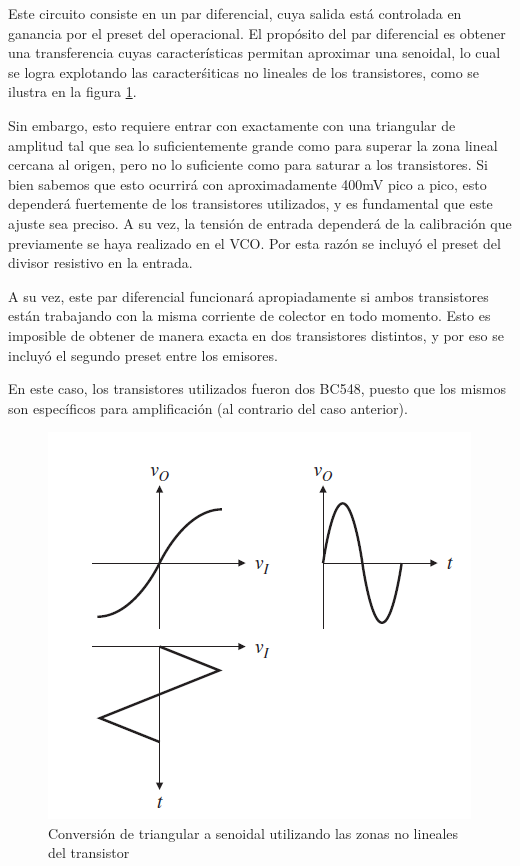 \documentclass[../../tc_tp6_main.tex]{subfiles}
\begin{document}
Este circuito consiste en un par diferencial, cuya salida est\'a controlada en ganancia por el preset del operacional. El prop\'osito del par diferencial es obtener una transferencia cuyas caracter\'isticas permitan aproximar una senoidal, lo cual se logra explotando las caracter\'siticas no lineales de los transistores, como se ilustra en la figura \ref{fig:curvatransistor}.\par

Sin embargo, esto requiere entrar con exactamente con una triangular de amplitud tal que sea lo suficientemente grande como para superar la zona lineal cercana al origen, pero no lo suficiente como para saturar a los transistores. Si bien sabemos que esto ocurrir\'a con aproximadamente 400mV pico a pico, esto depender\'a fuertemente de los transistores utilizados, y es fundamental que este ajuste sea preciso. A su vez, la tensi\'on de entrada depender\'a de la calibraci\'on que previamente se haya realizado en el VCO. Por esta raz\'on se incluy\'o el preset del divisor resistivo en la entrada. \par

A su vez, este par diferencial funcionar\'a apropiadamente si ambos transistores est\'an trabajando con la misma corriente de colector en todo momento. Esto es imposible de obtener de manera exacta en dos transistores distintos, y por eso se incluy\'o el segundo preset entre los emisores. \par

En este caso, los transistores utilizados fueron dos BC548, puesto que los mismos son espec\'ificos para amplificaci\'on (al contrario del caso anterior).\par 

\begin{figure}[H]
	\centering
	\includegraphics[scale=0.8]{imagenes/triang-sin.png}
	\caption{Conversi\'on de triangular a senoidal utilizando las zonas no lineales del transistor}
	\label{fig:curvatransistor}
\end{figure}
\end{document}
